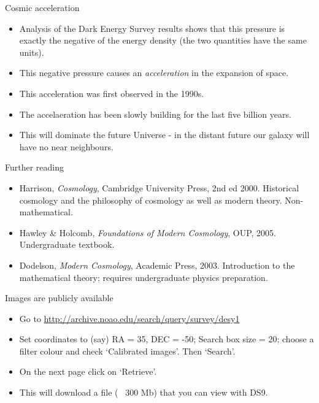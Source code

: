 \documentclass[usenames,dvipsnames]{beamer}
\begin{document}
\begin{frame}{Cosmic acceleration}
  \begin{block}{}
    \begin{itemize}
      \item{Analysis of the Dark Energy Survey results shows that this pressure is exactly the negative of the energy density (the two quantities have the same units).}
      \item{This negative pressure causes an \textit{acceleration} in the expansion of space.}
      \item{This acceleration was first observed in the 1990s.}
      \item{The accelaeration has been slowly building for the last five billion years.}
      \item{This will dominate the future Universe - in the distant future our galaxy will have no near neighbours.}
    \end{itemize}
  \end{block}
\end{frame}

\begin{frame}{Further reading}
  \begin{block}{}
    \begin{itemize}
      \item{Harrison, \textit{Cosmology}, Cambridge University Press, 2nd ed 2000. Historical cosmology and the philosophy of cosmology as well as modern theory. Non-mathematical.}
      \item{Hawley \& Holcomb, \textit{Foundations of Modern Cosmology}, OUP, 2005. Undergraduate textbook.}
      \item{Dodelson, \textit{Modern Cosmology}, Academic Press, 2003. Introduction to the mathematical theory; requires undergraduate physics preparation.}
    \end{itemize}
  \end{block}
\end{frame}


\begin{frame}{Images are publicly available}
  \begin{block}{}
    \begin{itemize}
      \item{Go to \url{http://archive.noao.edu/search/query/survey/desy1}}
      \item{Set coordinates to (say) RA = 35, DEC = -50; Search box size = 20; choose a filter colour and check `Calibrated images'. Then `Search'.}
      \item{On the next page click on `Retrieve'.}
      \item{This will download a file (~ 300 Mb) that you can view with DS9.}
    \end{itemize}
  \end{block}
\end{frame}
\end{document}
